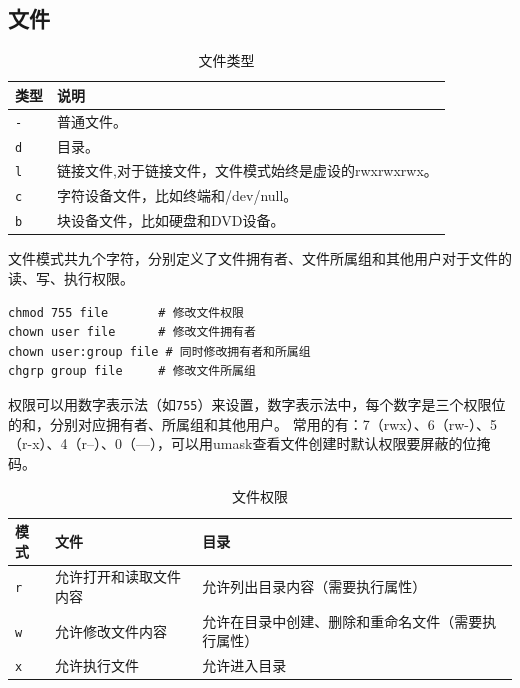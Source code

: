 \subsection{文件}
\begin{table}[H]
	\centering
	\begin{tabular}{|l|l|}
		\hline
		\textbf{类型} & \textbf{说明}                      \\
		\hline
		\texttt{-}  & 普通文件。                            \\
		\hline
		\texttt{d}  & 目录。                              \\
		\hline
		\texttt{l}  & 链接文件,对于链接文件，文件模式始终是虚设的rwxrwxrwx。 \\
		\hline
		\texttt{c}  & 字符设备文件，比如终端和/dev/null。           \\
		\hline
		\texttt{b}  & 块设备文件，比如硬盘和DVD设备。                \\
		\hline
	\end{tabular}
	\caption{文件类型}
\end{table}

文件模式共九个字符，分别定义了文件拥有者、文件所属组和其他用户对于文件的读、写、执行权限。
\begin{code}[title=文件权限管理]
	\begin{verbatim}
chmod 755 file       # 修改文件权限
chown user file      # 修改文件拥有者
chown user:group file # 同时修改拥有者和所属组
chgrp group file     # 修改文件所属组
	\end{verbatim}
\end{code}

权限可以用数字表示法（如\texttt{755}）来设置，数字表示法中，每个数字是三个权限位的和，分别对应拥有者、所属组和其他用户。
常用的有：7（rwx）、6（rw-）、5（r-x）、4（r--）、0（---），可以用umask查看文件创建时默认权限要屏蔽的位掩码。
\begin{table}[H]
	\centering
	\begin{tabular}{|l|l|p{6cm}|}
		\hline
		\textbf{模式} & \textbf{文件} & \textbf{目录}               \\
		\hline
		\texttt{r}  & 允许打开和读取文件内容 & 允许列出目录内容（需要执行属性）          \\
		\hline
		\texttt{w}  & 允许修改文件内容    & 允许在目录中创建、删除和重命名文件（需要执行属性） \\
		\hline
		\texttt{x}  & 允许执行文件      & 允许进入目录                    \\
		\hline
	\end{tabular}
	\caption{文件权限}
\end{table}

